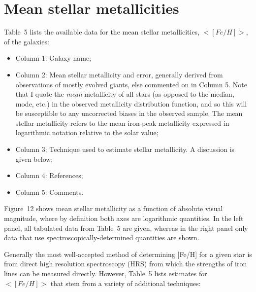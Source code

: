 \documentclass[manuscript]{aastex}
\begin{document}
\section{Mean stellar metallicities}

Table~5 lists the available data for the mean stellar metallicities, $<[Fe/H]>$, of the galaxies:

\begin{itemize}

\item Column 1: Galaxy name;

\item Column 2: Mean stellar metallicity and error, generally derived
  from observations of mostly evolved giants, else commented on in
  Column 5. Note that I quote the {\it mean} metallicity of all stars
  (as opposed to the median, mode, etc.) in the observed metallicity
  distribution function, and so this will be susceptible to any
  uncorrected biases in the observed sample. The mean stellar metallicity refers to the
  mean iron-peak metallicity expressed in logarithmic notation
  relative to the solar value;

\item Column 3: Technique used to estimate stellar metallicity. A
  discussion is given below;

\item Column 4: References;

\item Column 5: Comments.

\end{itemize}

Figure~12 shows mean stellar metallicity as a function of absolute visual
magnitude, where by definition both axes are logarithmic
quantities. In the left panel, all tabulated data from Table~5 are
given, whereas in the right panel only data that use
spectroscopically-determined quantities are shown. 

Generally the most well-accepted method of determining [Fe/H] for a
given star is from direct high resolution spectroscopy (HRS) from which the
strengths of iron lines can be measured directly. However, Table~5
lists estimates for $<[Fe/H]>$ that stem from a variety of additional techniques:
\end{document}
